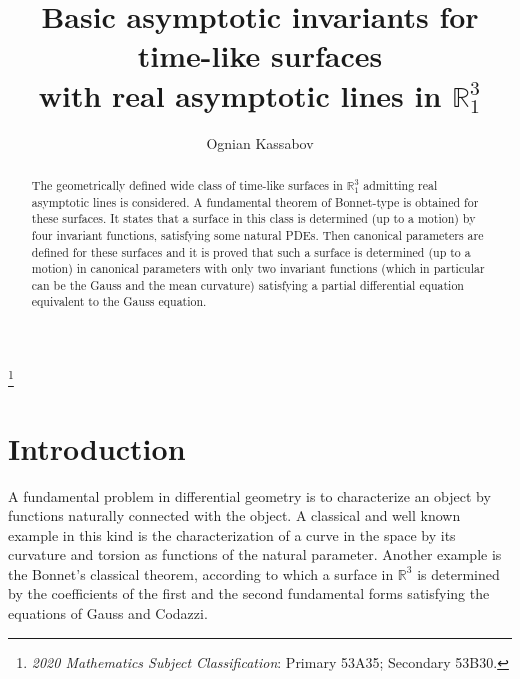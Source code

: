 \documentclass[12pt]{amsart}
\theoremstyle{definition}
\theoremstyle{remark}
\begin{document}
\title[Basic asymptotic invariants for time-like surfaces in $\mathbb R^3_1$  ]
{Basic asymptotic invariants for time-like surfaces \\ with real asymptotic lines in $\mathbb R^3_1$}%

\thanks {{\it 2020 Mathematics Subject Classification}:   Primary 53A35; Secondary 53B30.  }
\author{Ognian Kassabov}%
\address{Institute of Mathematics and Informatics, Bulgarian Academy of Sciences, \\ Acad. G. Bonchev Str. bl. 8, 1113, Sofia, Bulgaria}

%

\begin{abstract}
The geometrically defined wide class of time-like surfaces in $\mathbb R^3_1$ admitting real asymptotic lines is considered.
A fundamental theorem of Bonnet-type is obtained for these surfaces. It states that a surface in this class is determined
(up to a motion) by four invariant functions, satisfying some
natural PDEs. Then canonical parameters are defined for these surfaces and it is proved that such a 
surface  is determined (up to a motion) in canonical parameters with only two invariant functions (which in particular
can be the Gauss and the mean curvature) satisfying 
a partial differential equation equivalent to the Gauss equation.  
\end{abstract}
\maketitle






\section{Introduction}
\vspace{0.5cm}

A fundamental problem in  differential geometry is to characterize an object by
functions naturally connected with the object. A classical and well known example 
in this kind is the characterization of a curve in the space by its curvature 
and torsion as functions of the natural parameter.
Another example is the Bonnet's classical theorem, according to which a surface in 
$\mathbb R^3$ is determined by the coefficients of the first and the second fundamental
forms satisfying the equations of Gauss and Codazzi.
\end{document}
